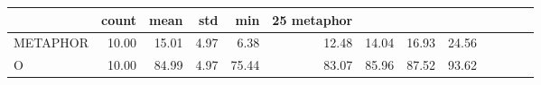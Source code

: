 \begin{tabular}{lrrrrrrrr}
\toprule
 & count & mean & std & min & 25%
metaphor &  &  &  &  &  &  &  &  \\
\midrule
METAPHOR & 10.00 & 15.01 & 4.97 & 6.38 & 12.48 & 14.04 & 16.93 & 24.56 \\
O & 10.00 & 84.99 & 4.97 & 75.44 & 83.07 & 85.96 & 87.52 & 93.62 \\
\bottomrule
\end{tabular}
